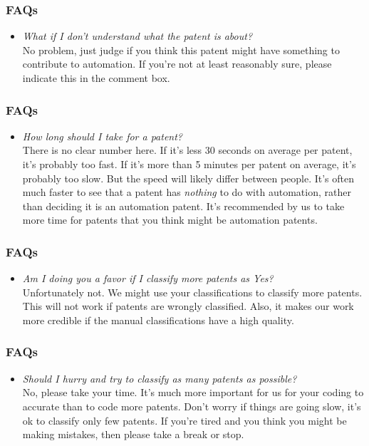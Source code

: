 \documentclass[10pt]{beamer}
\begin{document}
\begin{frame}\frametitle{FAQs}
	\begin{itemize}	
	\item \textit{What if I don't understand what the patent is about?}\\[0.1cm]
	No problem, just judge if you think this patent might have something to contribute to automation. If you're not at least reasonably sure, please indicate this in the comment box.
	\end{itemize}
\end{frame}
	
\begin{frame}\frametitle{FAQs}
	\begin{itemize}	
	\item \textit{How long should I take for a patent?}\\[0.1cm]
	There is no clear number here. If it's less 30 seconds on average per patent, it's probably too fast. If it's more than 5 minutes per patent on average, it's probably too slow. But the speed will likely differ between people. It's often much faster to see that a patent has \textit{nothing} to do with automation, rather than deciding it is an automation patent. It's recommended by us to take more time for patents that you think might be automation patents.
	\end{itemize}
\end{frame}

\begin{frame}\frametitle{FAQs}
	\begin{itemize}	
	\item \textit{Am I doing you a favor if I classify more patents as Yes?}\\[0.1cm]
	Unfortunately not. We might use your classifications to classify more patents. This will not work if patents are wrongly classified. Also, it makes our work more credible if the manual classifications have a high quality.
	\end{itemize}
\end{frame}
	
\begin{frame}\frametitle{FAQs}
	\begin{itemize}	
	\item \textit{Should I hurry and try to classify as many patents as possible?}\\[0.1cm]
	No, please take your time. It's much more important for us for your coding to accurate than to code more patents. Don't worry if things are going slow, it's ok to classify only few patents. If you're tired and you think you might be making mistakes, then please take a break or stop.
	\end{itemize}
\end{frame}
\end{document}
